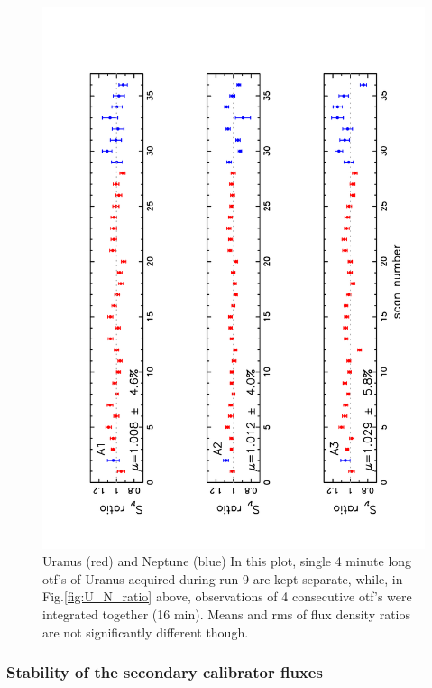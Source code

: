 \begin{figure}[p]
\begin{center}
  \includegraphics[clip, angle=-90, scale=0.6]{Figures/Flux_ratio_index_A1_A2_A3.pdf}
  \caption[Stability of calibration with the primary calibrators]{ Uranus (red) and Neptune (blue)
    In this plot, single 4 minute long otf's of Uranus acquired during
    run 9 are kept separate, 
while, in Fig.\ref{fig:U_N_ratio} above, observations of 4 consecutive otf's were integrated together (16 min).
    Means and rms of flux density ratios are not significantly different though.}
\label{fig:U_otf_indiv}
\end{center}
\end{figure}

\subsubsection{Stability of the secondary calibrator fluxes}

